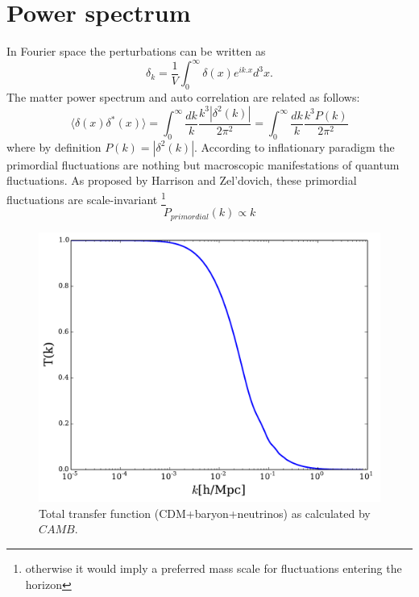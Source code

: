 \section{Power spectrum}
\label{density_ps}
In Fourier space the perturbations can be written as 
\begin{equation}
\delta_{k} = \frac{1}{V} \int^{\infty}_{0} \delta(x) e^{ik.x} d^{3}x .
\end{equation}
The matter power spectrum and auto correlation are related as follows:
\begin{equation}
\langle \delta(x) \delta^{*}(x) \rangle = \int^{\infty}_{0} \frac{dk}{k} \frac{k^{3} |\delta^{2}(k)|}{2\pi^{2}} = \int^{\infty}_{0} \frac{dk}{k}\frac{k^{3} P(k)}{2\pi^{2}}
\end{equation}
where by definition $P(k) = |\delta^{2}(k)|$.
According to inflationary paradigm the primordial fluctuations are nothing but macroscopic manifestations of quantum fluctuations. 
As proposed by Harrison and Zel'dovich, these primordial fluctuations are scale-invariant \footnote{ otherwise it would imply a preferred mass scale for fluctuations entering the horizon}
\begin{equation}
P_{primordial}(k) \propto k
\end{equation}

\begin{figure}[H]
\includegraphics[width = \columnwidth]{figs/tf.pdf}
\caption{Total transfer function (CDM+baryon+neutrinos) as calculated by $CAMB$.}
\label{tf}
\end{figure}

